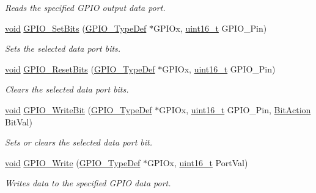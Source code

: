 \begin{DoxyCompactItemize}
\begin{DoxyCompactList}\small\item\em Reads the specified G\-P\-I\-O output data port. \end{DoxyCompactList}\item 
\hyperlink{group___n_a_m_e_ga18028b8badbf1ea7e704ccac3c488e82}{void} \hyperlink{group___g_p_i_o___group2_ga9e1352eed7c6620e18af2d86f6b6ff8e}{G\-P\-I\-O\-\_\-\-Set\-Bits} (\hyperlink{struct_g_p_i_o___type_def}{G\-P\-I\-O\-\_\-\-Type\-Def} $\ast$G\-P\-I\-Ox, \hyperlink{stdint_8h_a273cf69d639a59973b6019625df33e30}{uint16\-\_\-t} G\-P\-I\-O\-\_\-\-Pin)
\begin{DoxyCompactList}\small\item\em Sets the selected data port bits. \end{DoxyCompactList}\item 
\hyperlink{group___n_a_m_e_ga18028b8badbf1ea7e704ccac3c488e82}{void} \hyperlink{group___g_p_i_o___group2_ga6fcd35b207a66608dd2c9d7de9247dc8}{G\-P\-I\-O\-\_\-\-Reset\-Bits} (\hyperlink{struct_g_p_i_o___type_def}{G\-P\-I\-O\-\_\-\-Type\-Def} $\ast$G\-P\-I\-Ox, \hyperlink{stdint_8h_a273cf69d639a59973b6019625df33e30}{uint16\-\_\-t} G\-P\-I\-O\-\_\-\-Pin)
\begin{DoxyCompactList}\small\item\em Clears the selected data port bits. \end{DoxyCompactList}\item 
\hyperlink{group___n_a_m_e_ga18028b8badbf1ea7e704ccac3c488e82}{void} \hyperlink{group___g_p_i_o___group2_ga8f7b237fd744d9f7456fbe0da47a9b80}{G\-P\-I\-O\-\_\-\-Write\-Bit} (\hyperlink{struct_g_p_i_o___type_def}{G\-P\-I\-O\-\_\-\-Type\-Def} $\ast$G\-P\-I\-Ox, \hyperlink{stdint_8h_a273cf69d639a59973b6019625df33e30}{uint16\-\_\-t} G\-P\-I\-O\-\_\-\-Pin, \hyperlink{stm32f10x__gpio_8h_a176130b21c0e719121470a6042d4cf19}{Bit\-Action} Bit\-Val)
\begin{DoxyCompactList}\small\item\em Sets or clears the selected data port bit. \end{DoxyCompactList}\item 
\hyperlink{group___n_a_m_e_ga18028b8badbf1ea7e704ccac3c488e82}{void} \hyperlink{group___g_p_i_o___group2_gaa925f19c8547a00c7a0c269a84873bf9}{G\-P\-I\-O\-\_\-\-Write} (\hyperlink{struct_g_p_i_o___type_def}{G\-P\-I\-O\-\_\-\-Type\-Def} $\ast$G\-P\-I\-Ox, \hyperlink{stdint_8h_a273cf69d639a59973b6019625df33e30}{uint16\-\_\-t} Port\-Val)
\begin{DoxyCompactList}\small\item\em Writes data to the specified G\-P\-I\-O data port. \end{DoxyCompactList}\item 

\end{DoxyCompactItemize}
